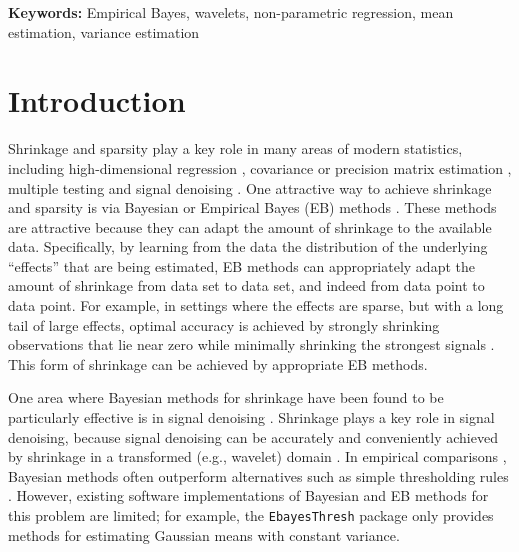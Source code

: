 \documentclass[twoside]{article}
\begin{document}
{\bf Keywords:} Empirical Bayes, wavelets, non-parametric regression,
mean estimation, variance estimation

\section{Introduction}

Shrinkage and sparsity play a key role in many areas of modern
statistics, including high-dimensional regression
\citep{Tibshirani1996Regression}, covariance or precision matrix
estimation \citep{Bickel2008Covariance}, multiple testing
\citep{Efron2004} and signal denoising \citep{Donoho1994Ideal,
  donoho95}. One attractive way to achieve shrinkage and sparsity is
via Bayesian or Empirical Bayes (EB) methods
\citep[e.g.,][]{Efron2002Empirical, Johnstone2004Needles,
  Johnstone2005Empirical, Clyde2000Flexible,
  Daniels2001Shrinkage}. These methods are attractive because they can
adapt the amount of shrinkage to the available data. Specifically, by
learning from the data the distribution of the underlying ``effects''
that are being estimated, EB methods can appropriately adapt the
amount of shrinkage from data set to data set, and indeed from data
point to data point. For example, in settings where the effects are
sparse, but with a long tail of large effects, optimal accuracy is
achieved by strongly shrinking observations that lie near zero while
minimally shrinking the strongest signals \citep{polson2010shrink}.
This form of shrinkage can be achieved by appropriate EB methods.

One area where Bayesian methods for shrinkage have been found to be
particularly effective is in signal denoising
\citep{abramovich1998wavelet, Clyde2000Flexible,
  Johnstone2005Empirical}. Shrinkage plays a key role in signal
denoising, because signal denoising can be accurately and conveniently
achieved by shrinkage in a transformed (e.g., wavelet) domain
\citep{Donoho1994Ideal}. In empirical comparisons
\citep[e.g.,][]{Antoniadis2001Wavelet, Besbeas2004Comparative},
Bayesian methods often outperform alternatives such as simple
thresholding rules \citep{Coifman1995Translationinvariant,
  Donoho1994Ideal}. However, existing software implementations of
Bayesian and EB methods for this problem are limited; for example, the
{\tt EbayesThresh} package \citep{johnstone2005ebayesthresh} only
provides methods for estimating Gaussian means with constant
variance.


\end{document}
